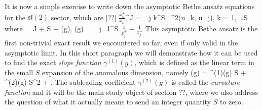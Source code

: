 It is now a simple exercise to write down the asymptotic Bethe ansatz equations for the $\mathfrak{sl}(2)$ sector, which are [??]
\beq
	\label{eq:sl2_aba}
	\( \frac{x_k^+}{x_k^-} \)^J = \prod_{j \neq k}^S  \,  \; \sigma^2(u_k, u_j), \;\;\; k = 1, \dots S
\eeq
where 
\beq
	\Delta = J + S + \gamma(g), \;\;\; \gamma(g) =  \sum_{j=1}^S \( \frac{1}{x_j^+} - \frac{1}{x_j^-} \)
\eeq
This asymptotic Bethe ansatz  is the first non-trivial exact result we encountered so far, even if only valid in the asymptotic limit. In this short paragraph we will demonstrate how it can be used to find the exact \emph{slope function} $\gamma^{(1)}(g)$, which is defined as the linear term in the small $S$ expansion of the anomalous dimension, namely
\beq
	\gamma(g) = \gamma^{(1)}(g) \; S + \gamma^{(2)}(g) \; S^2 + .
\eeq
The subleading coefficient $\gamma^{(2)}(g)$ is called the \emph{curvature function} and it will be the main study object of section ??, where we also address the question of what it actually means to send an integer quantity $S$ to zero. 

